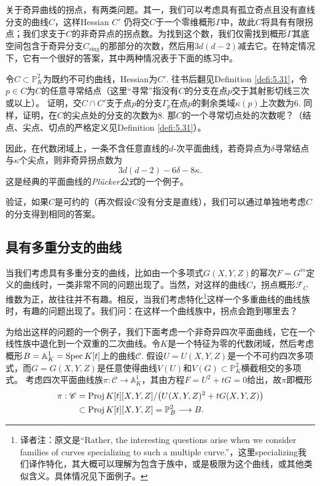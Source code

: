 
关于奇异曲线的拐点，有两类问题。其一，我们可以考虑具有孤立奇点且没有直线分支的曲线$C$，这样Hessian $C'$ 仍将交$C$于一个零维概形$\Gamma$中，故此$C$将具有有限拐点；我们求支于$C$的非奇异点的拐点数。为找到这个数，我们仅需找到概形$\Gamma$其底空间包含于奇异分支$C_{\text{sing}}$的那部分的次数，然后用$3d(d-2)$减去它。在特定情况下，它有一个很好的答案，其中两种情况表于下面的练习中。

\begin{exe}\label{exe:4.8}
	令$C\subset \mathbb P_K^2$为既约不可约曲线，Hessian为$C'$. 往书后翻见Definition \ref{defi:5.31}，令$p\in C$为$C$的任意寻常结点（这里“寻常”指没有$C$的分支在点$p$交于其射影切线三次或以上）。
	证明，交$C\cap C'$支于点$p$的分支$\Gamma_p$在点$p$的剩余类域$\kappa(p)$上次数为$6$. 同样，证明，在$C$的尖点处的分支的次数为$8$. 那$C$的一个寻常切点处的次数呢？（结点、尖点、切点的严格定义见Definition \ref{defi:5.31}）。
\end{exe}

因此，在代数闭域上，一条不含任意直线的$d$-次平面曲线，若奇异点为$\delta$寻常结点与$\kappa$个尖点，则非奇异拐点数为
\[
	3d(d-2)-6\delta -8\kappa.
\]
这是经典的平面曲线的\textit{Pl\"ucker公式}的一个例子。

\begin{exe}\label{exe:4.9}
	验证，如果$C$是可约的（再次假设$C$没有分支是直线），我们可以通过单独地考虑$C$的分支得到相同的答案。
\end{exe}

\subsection{具有多重分支的曲线}\label{s:4.1.3}

当我们考虑具有多重分支的曲线，比如由一个多项式$G(X,Y,Z)$的幂次$F=G^m$定义的曲线时，一类非常不同的问题出现了。当然，对这样的曲线$C$，拐点概形$\mathscr F_C$维数为正，故往往并不有趣。相反，当我们考虑特化\footnote{译者注：原文是``Rather, the interesting questions arise when we consider families of curves specializing to such a multiple curve.''，这里specializing我们译作特化，其大概可以理解为包含于族中，或是极限为这个曲线，或其他类似含义。具体情况见下面例子。}这样一个多重曲线的曲线族时，有趣的问题出现了。我们问：在这样一个曲线族中，拐点会跑到哪里去？

为给出这样的问题的一个例子，我们下面考虑一个非奇异四次平面曲线，它在一个线性族中退化到一个双重的二次曲线。令$K$是一个特征为零的代数闭域，然后考虑概形$B=\mathbb A_K^1=\operatorname{Spec} K[t]$上的曲线$\mathscr C$. 假设$U=U(X,Y,Z)$是一个不可约四次多项式，而$G=G(X,Y,Z)$是任意使得曲线$V(U)$和$V(G)\subset \mathbb P_K^2$横截相交的多项式。
考虑四次平面曲线族$\pi:\mathscr C\to \mathbb A_K^1$，其由方程$F=U^2+tG=0$给出，故$\pi$即概形
\[
	\begin{aligned}
	\pi:\mathscr C&=\operatorname{Proj} K[t][X,Y,Z]/\bigl(U(X,Y,Z)^2+tG(X,Y,Z)\bigr)\\
	&\subset \operatorname{Proj} K[t][X,Y,Z]=\mathbb P_B^2\longrightarrow B.
	\end{aligned}
\]

